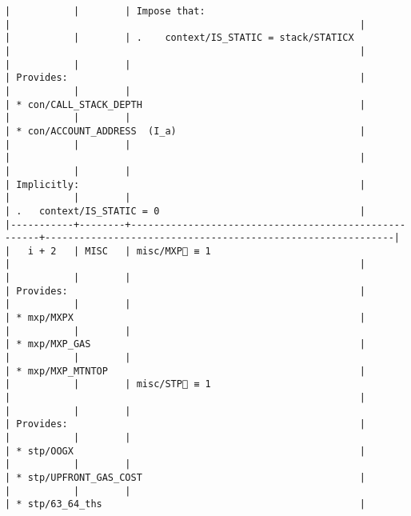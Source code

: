 \documentclass[varwidth=\maxdimen,margin=0.5cm,multi={verbatim}]{standalone}
\begin{document}
\begin{verbatim}
|           |        | Impose that:                                         |                                                             |
|           |        | .    context/IS_STATIC = stack/STATICX               |                                                             |
|           |        |                                                      | Provides:                                                   |
|           |        |                                                      | * con/CALL_STACK_DEPTH                                      |
|           |        |                                                      | * con/ACCOUNT_ADDRESS  (I_a)                                |
|           |        |                                                      |                                                             |
|           |        |                                                      | Implicitly:                                                 |
|           |        |                                                      | .   context/IS_STATIC = 0                                   |
|-----------+--------+------------------------------------------------------+-------------------------------------------------------------|
|   i + 2   | MISC   | misc/MXP🚩 ≡ 1                                       |                                                             |
|           |        |                                                      | Provides:                                                   |
|           |        |                                                      | * mxp/MXPX                                                  |
|           |        |                                                      | * mxp/MXP_GAS                                               |
|           |        |                                                      | * mxp/MXP_MTNTOP                                            |
|           |        | misc/STP🚩 ≡ 1                                       |                                                             |
|           |        |                                                      | Provides:                                                   |
|           |        |                                                      | * stp/OOGX                                                  |
|           |        |                                                      | * stp/UPFRONT_GAS_COST                                      |
|           |        |                                                      | * stp/63_64_ths                                             |

\end{verbatim}
\end{document}
